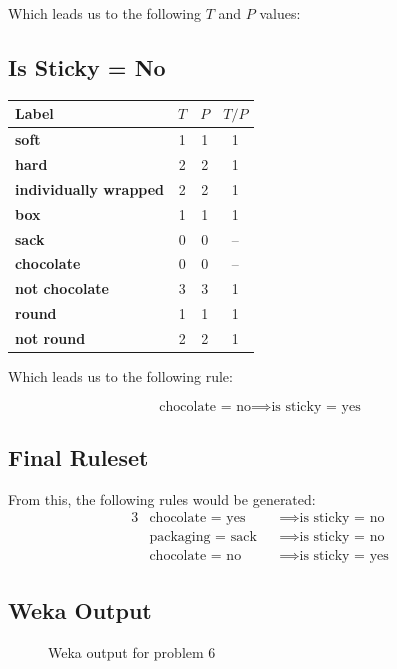 \documentclass[12pt]{scrartcl}
\begin{document}
Which leads us to the following $T$ and $P$ values:

\subsection{Is Sticky = No}
\begin{table}[H]
    \centering
    \begin{tabular}{|l|c|c|c|}
        \hline
        \textbf{Label}                 & $T$ & $P$ & $T/P$ \\\hline
        \textbf{soft}                 & 1   & 1   & 1 \\
        \textbf{hard}                 & 2   & 2   & 1 \\
        \textbf{individually wrapped} & 2   & 2   & 1 \\
        \textbf{box}                  & 1   & 1   & 1 \\
        \textbf{sack}                 & 0   & 0   & -- \\
        \textbf{chocolate}            & 0   & 0   & -- \\
        \textbf{not chocolate}        & 3   & 3   & 1 \\
        \textbf{round}                & 1   & 1   & 1 \\
        \textbf{not round}            & 2   & 2   & 1 \\\hline
    \end{tabular}
\end{table}

Which leads us to the following rule:

\begin{equation*}
    \text{chocolate = no} \implies \text{is sticky = yes}
\end{equation*}

\subsection{Final Ruleset}
From this, the following rules would be generated:
\begin{alignat*}{3}
    &\text{chocolate = yes}  &&\implies \text{is sticky = no} \\
    &\text{packaging = sack} &&\implies \text{is sticky = no} \\
    &\text{chocolate = no}   &&\implies \text{is sticky = yes}
\end{alignat*}

\subsection{Weka Output}
\begin{figure}[H]
    \centering
    \caption{Weka output for problem 6}
    \label{fig:assets/homework-1-6}
\end{figure}
\end{document}
